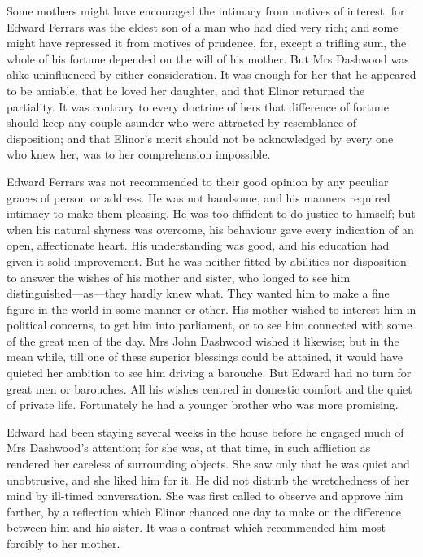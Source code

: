Some mothers might have encouraged the intimacy from motives of interest, for Edward Ferrars was the eldest son of a man who had died very rich; and some might have repressed it from motives of prudence, for, except a trifling sum, the whole of his fortune depended on the will of his mother. But Mrs Dashwood was alike uninfluenced by either consideration. It was enough for her that he appeared to be amiable, that he loved her daughter, and that Elinor returned the partiality. It was contrary to every doctrine of hers that difference of fortune should keep any couple asunder who were attracted by resemblance of disposition; and that Elinor's merit should not be acknowledged by every one who knew her, was to her comprehension impossible.

Edward Ferrars was not recommended to their good opinion by any peculiar graces of person or address. He was not handsome, and his manners required intimacy to make them pleasing. He was too diffident to do justice to himself; but when his natural shyness was overcome, his behaviour gave every indication of an open, affectionate heart. His understanding was good, and his education had given it solid improvement. But he was neither fitted by abilities nor disposition to answer the wishes of his mother and sister, who longed to see him distinguished—as—they hardly knew what. They wanted him to make a fine figure in the world in some manner or other. His mother wished to interest him in political concerns, to get him into parliament, or to see him connected with some of the great men of the day. Mrs John Dashwood wished it likewise; but in the mean while, till one of these superior blessings could be attained, it would have quieted her ambition to see him driving a barouche. But Edward had no turn for great men or barouches. All his wishes centred in domestic comfort and the quiet of private life. Fortunately he had a younger brother who was more promising.

Edward had been staying several weeks in the house before he engaged much of Mrs Dashwood's attention; for she was, at that time, in such affliction as rendered her careless of surrounding objects. She saw only that he was quiet and unobtrusive, and she liked him for it. He did not disturb the wretchedness of her mind by ill-timed conversation. She was first called to observe and approve him farther, by a reflection which Elinor chanced one day to make on the difference between him and his sister. It was a contrast which recommended him most forcibly to her mother.


